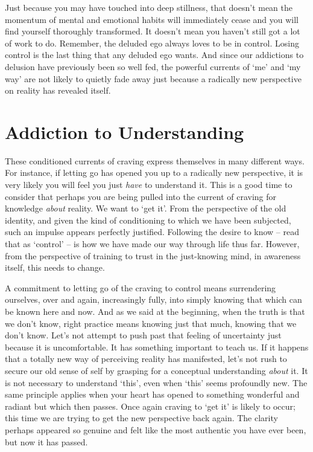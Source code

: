 Just because you may have touched into deep stillness, that doesn’t mean
the momentum of mental and emotional habits will immediately cease and
you will find yourself thoroughly transformed. It doesn’t mean you
haven’t still got a lot of work to do. Remember, the deluded ego always
loves to be in control. Losing control is the last thing that any
deluded ego wants. And since our addictions to delusion have previously
been so well fed, the powerful currents of ‘me’ and ‘my way’ are not
likely to quietly fade away just because a radically new perspective on
reality has revealed itself.

\section{Addiction to Understanding}

These conditioned currents of craving express themselves in many
different ways. For instance, if letting go has opened you up to a
radically new perspective, it is very likely you will feel you just
\emph{have} to understand it. This is a good time to consider that perhaps
you are being pulled into the current of craving for knowledge \emph{about}
reality. We want to ‘get it’. From the perspective of the old identity,
and given the kind of conditioning to which we have been subjected, such
an impulse appears perfectly justified. Following the desire to know –
read that as ‘control’ – is how we have made our way through life thus
far. However, from the perspective of training to trust in the
just-knowing mind, in awareness itself, this needs to change.

A commitment to letting go of the craving to control means surrendering
ourselves, over and again, increasingly fully, into simply knowing that
which can be known here and now. And as we said at the beginning, when
the truth is that we don’t know, right practice means knowing just that
much, knowing that we don’t know. Let’s not attempt to push past that
feeling of uncertainty just because it is uncomfortable. It has
something important to teach us. If it happens that a totally new way of
perceiving reality has manifested, let’s not rush to secure our old
sense of self by grasping for a conceptual understanding \emph{about} it. It
is not necessary to understand ‘this’, even when ‘this’ seems profoundly
new. The same principle applies when your heart has opened to something
wonderful and radiant but which then passes. Once again craving to ‘get
it’ is likely to occur; this time we are trying to get the new
perspective back again. The clarity perhaps appeared so genuine and felt
like the most authentic you have ever been, but now it has passed.

